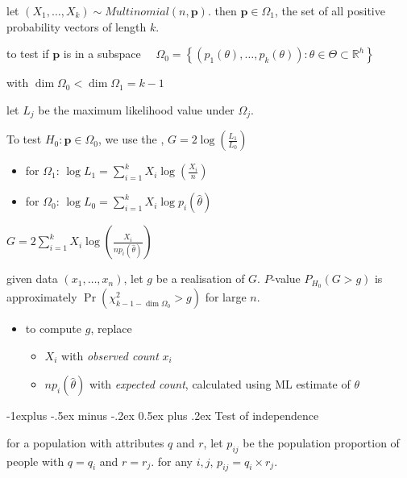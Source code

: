 \documentclass[10pt, landscape]{article}
\makeatletter
\renewcommand{\subsection}{\@startsection{subsection}{2}{0mm}%
  {-1explus -.5ex minus -.2ex}%
  {0.5ex plus .2ex}%
{\normalfont\normalsize\bfseries}}
\newcommand{\seq}[2][n]{#2_1, \dots, #2_{#1}}
\makeatother
\begin{document}
\begin{multicols*}{4}
  let $(\seq[k]{X}) \sim Multinomial(n, \mathbf{p})$. 
  then $\mathbf{p} \in \Omega_1$, the set of all positive probability vectors of length $k$.

  \smallskip
  to test if $\mathbf{p}$ is in a subspace
  $\quad\Omega_0 = \left\{ (p_1(\theta), \dots, p_k(\theta)) : \theta \in \Theta \subset \mathbb{R}^h \right\}$ 

  with $\dim\Omega_0 < \dim\Omega_1 = k-1$

  \begin{tightcenter}

    let $L_j$ be the maximum likelihood value under $\Omega_j$. 

    To test $H_0 : \mathbf{p} \in \Omega_0$, we use the , $G = 2\log(\frac{L_1}{L_0})$
  \end{tightcenter}

  \begin{itemize}
    \item for $\Omega_1$: $\log L_1 = \sum^k_{i=1} X_i \log (\frac{X_i}{n})$
    \item for $\Omega_0$: $\log L_0 = \sum^k_{i=1} X_i \log p_i(\hat\theta)$
  \end{itemize}

  \begin{tightcenter}
    $G = 2\sum^k_{i=1} X_i \log \left( \frac{X_i}{np_i(\hat\theta)} \right)$
  \end{tightcenter}

  given data $(\seq x)$, let $g$ be a realisation of $G$. 
  $P$-value $P_{H_0} (G > g)$ is approximately $\Pr (\chi^2_{k-1-\dim\Omega_0} > g)$ for large $n$.

  \begin{itemize}
    \item to compute $g$, replace
      \begin{itemize}
        \item $X_i$ with \textit{observed count} $x_i$
        \item $np_i(\hat\theta)$ with \textit{expected count}, calculated using ML estimate of  $\theta$
      \end{itemize}
  \end{itemize}

  \subsection{Test of independence}

  for a population with attributes $q$ and $r$, 
  let $p_{ij}$ be the population proportion of people with $q=q_i$ and $r=r_j$.
  for any $i, j$, $p_{ij} = q_i \times r_j$.


\end{multicols*}
\end{document}
